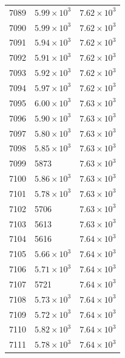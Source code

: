 \begin{table}[H]
\begin{tabular}{lll}
7089 & $\displaystyle 5.99 \times 10^{3}$ & $\displaystyle 7.62 \times 10^{3}$ \\
7090 & $\displaystyle 5.99 \times 10^{3}$ & $\displaystyle 7.62 \times 10^{3}$ \\
7091 & $\displaystyle 5.94 \times 10^{3}$ & $\displaystyle 7.62 \times 10^{3}$ \\
7092 & $\displaystyle 5.91 \times 10^{3}$ & $\displaystyle 7.62 \times 10^{3}$ \\
7093 & $\displaystyle 5.92 \times 10^{3}$ & $\displaystyle 7.62 \times 10^{3}$ \\
7094 & $\displaystyle 5.97 \times 10^{3}$ & $\displaystyle 7.62 \times 10^{3}$ \\
7095 & $\displaystyle 6.00 \times 10^{3}$ & $\displaystyle 7.63 \times 10^{3}$ \\
7096 & $\displaystyle 5.90 \times 10^{3}$ & $\displaystyle 7.63 \times 10^{3}$ \\
7097 & $\displaystyle 5.80 \times 10^{3}$ & $\displaystyle 7.63 \times 10^{3}$ \\
7098 & $\displaystyle 5.85 \times 10^{3}$ & $\displaystyle 7.63 \times 10^{3}$ \\
7099 & 5873 & $\displaystyle 7.63 \times 10^{3}$ \\
7100 & $\displaystyle 5.86 \times 10^{3}$ & $\displaystyle 7.63 \times 10^{3}$ \\
7101 & $\displaystyle 5.78 \times 10^{3}$ & $\displaystyle 7.63 \times 10^{3}$ \\
7102 & 5706 & $\displaystyle 7.63 \times 10^{3}$ \\
7103 & 5613 & $\displaystyle 7.63 \times 10^{3}$ \\
7104 & 5616 & $\displaystyle 7.64 \times 10^{3}$ \\
7105 & $\displaystyle 5.66 \times 10^{3}$ & $\displaystyle 7.64 \times 10^{3}$ \\
7106 & $\displaystyle 5.71 \times 10^{3}$ & $\displaystyle 7.64 \times 10^{3}$ \\
7107 & 5721 & $\displaystyle 7.64 \times 10^{3}$ \\
7108 & $\displaystyle 5.73 \times 10^{3}$ & $\displaystyle 7.64 \times 10^{3}$ \\
7109 & $\displaystyle 5.72 \times 10^{3}$ & $\displaystyle 7.64 \times 10^{3}$ \\
7110 & $\displaystyle 5.82 \times 10^{3}$ & $\displaystyle 7.64 \times 10^{3}$ \\
7111 & $\displaystyle 5.78 \times 10^{3}$ & $\displaystyle 7.64 \times 10^{3}$ \\

\end{tabular}
\end{table}
